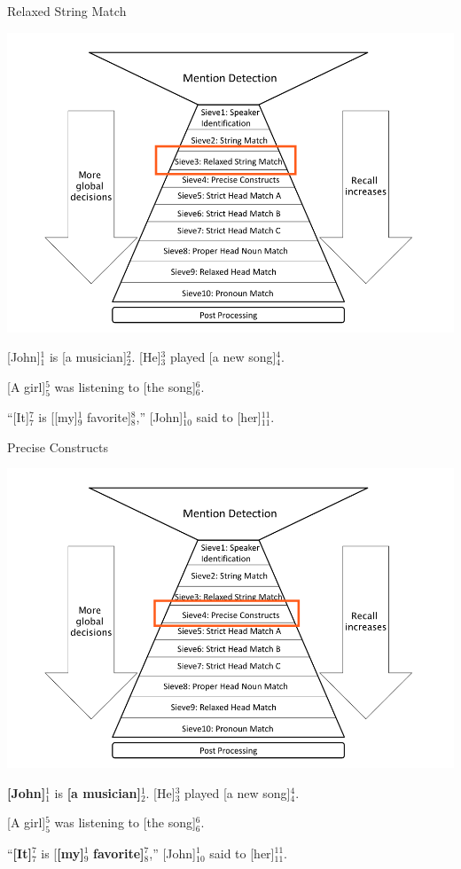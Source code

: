 \documentclass[11pt,a4paper]{beamer}
\begin{document}
\begin{frame}{Relaxed String Match}

\includegraphics[scale=0.15]{sieve3.png} 
\bigskip

[John]$^{1}_{1}$ is [a musician]$^{2}_{2}$. [He]$^{3}_{3}$ played [a new song]$^{4}_{4}$.

[A girl]$^{5}_{5}$ was listening to [the song]$^{6}_{6}$.

“[It]$^{7}_{7}$ is [[my]$^{1}_{9}$ favorite]$^{8}_{8}$,” [John]$^{1}_{10}$ said to [her]$^{11}_{11}$.

\end{frame}

\begin{frame}{Precise Constructs}

\includegraphics[scale=0.15]{sieve4.png} 
\bigskip

\textbf{[John]}$^{1}_{1}$ is \textbf{[a musician]}$^{1}_{2}$. [He]$^{3}_{3}$ played [a new song]$^{4}_{4}$.

[A girl]$^{5}_{5}$ was listening to [the song]$^{6}_{6}$.

“\textbf{[It]}$^{7}_{7}$ is [\textbf{[my]}$^{1}_{9}$ \textbf{favorite]}$^{7}_{8}$,” [John]$^{1}_{10}$ said to [her]$^{11}_{11}$.

\end{frame}
\end{document}
